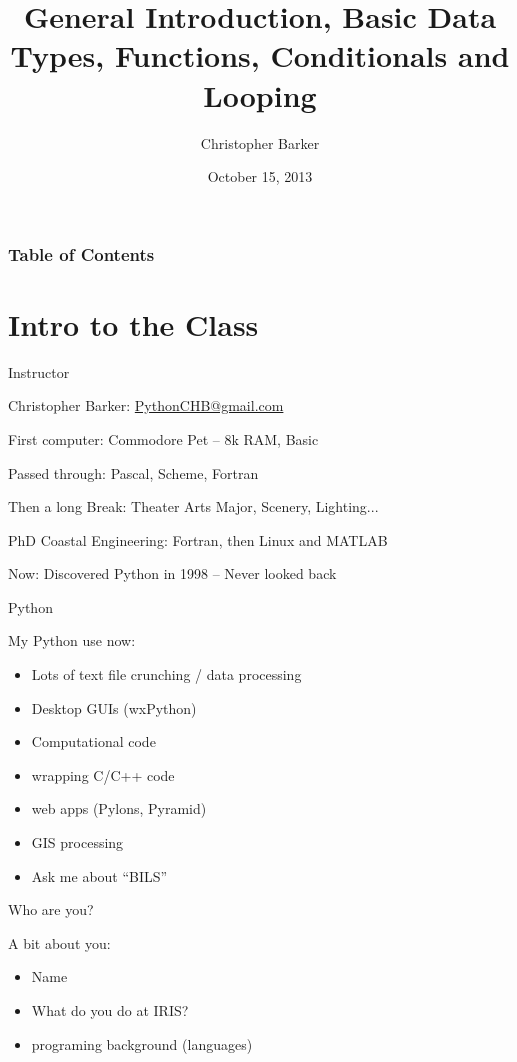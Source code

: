 \documentclass{beamer}
\title[IRIS Python Workshop Seesion 1]{General Introduction, Basic Data Types, Functions, Conditionals and Looping}
\author{Christopher Barker}
\institute{IRIS}
\date{October 15, 2013}
\begin{document}
\begin{frame}
\titlepage
\end{frame}

\begin{frame}
\frametitle{Table of Contents}
\tableofcontents
\end{frame}

\section{Intro to the Class}


\begin{frame}[fragile]{Instructor}

{\large Christopher Barker: \url{PythonCHB@gmail.com} }

\vfill
First computer: Commodore Pet -- 8k RAM, Basic

\vfill
Passed through: Pascal, Scheme, Fortran

\vfill
Then a long Break: Theater Arts Major, Scenery, Lighting...

\vfill
PhD Coastal Engineering: Fortran, then Linux and MATLAB

\vfill
Now: Discovered Python in 1998 -- Never looked back

\end{frame}

\begin{frame}{Python}

{\Large     My Python use now:}
\begin{itemize}
   \item Lots of text file crunching / data processing
   \item Desktop GUIs (wxPython)
   \item Computational code
   \item wrapping C/C++ code      
   \item web apps (Pylons, Pyramid)
   \item GIS processing
   \item Ask me about ``BILS'' 
\end{itemize}
\end{frame}


\begin{frame}{Who are you?}

{\Large A bit about you:}
\begin{itemize}
  \item Name
  \item What do you do at IRIS?
  \item programing background (languages)
\end{itemize}

\end{frame}
\end{document}
